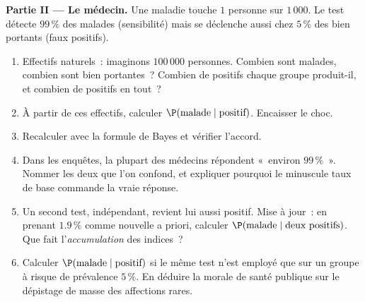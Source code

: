 \begin{problem}
\medskip
\noindent\textbf{Partie II --- Le médecin.}
Une maladie touche $1$ personne sur $1\,000$. Le test détecte
$99\,\%$ des malades (sensibilité) mais se déclenche aussi chez
$5\,\%$ des bien portants (faux positifs).
\begin{enumerate}[resume]
  \item Effectifs naturels~: imaginons $100\,000$ personnes.
        Combien sont malades, combien sont bien portantes~? Combien
        de positifs chaque groupe produit-il, et combien de positifs
        en tout~?
  \item À partir de ces effectifs, calculer
        $\P(\text{malade} \mid \text{positif})$. Encaisser le
        choc.
  \item Recalculer avec la formule de Bayes et vérifier l'accord.
  \item Dans les enquêtes, la plupart des médecins répondent
        «~environ $99\,\%$~». Nommer les deux  que l'on confond, et expliquer pourquoi le
        minuscule taux de base commande la vraie réponse.
  \item Un second test, indépendant, revient lui aussi positif.
        Mise à jour~: en prenant $1.9\,\%$ comme nouvelle
         a priori, calculer
        $\P(\text{malade} \mid \text{deux positifs})$. Que fait
        l'\emph{accumulation} des indices~?
  \item Calculer $\P(\text{malade} \mid \text{positif})$ si le même
        test n'est employé que sur un groupe à risque de prévalence
        $5\,\%$. En déduire la morale de santé publique sur le
        dépistage de masse des affections rares.
\end{enumerate}


\end{problem}
